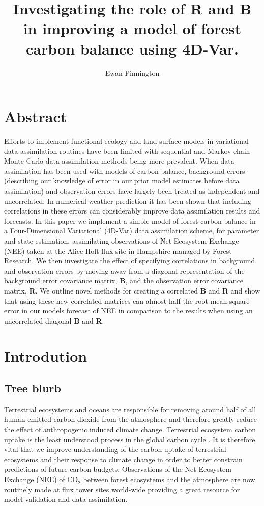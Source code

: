 \documentclass[11pt]{article}
\title{Investigating the role of \textbf{R} and \textbf{B} in improving a model of forest carbon balance using 4D-Var.}
\author{Ewan Pinnington}
\begin{document}
\maketitle

\section*{Abstract}

Efforts to implement functional ecology and land surface models in variational data assimilation routines have been limited with sequential and Markov chain Monte Carlo data assimilation methods being more prevalent. When data assimilation has been used with models of carbon balance, background errors (describing our knowledge of error in our prior model estimates before data assimilation) and observation errors have largely been treated as independent and uncorrelated. In numerical weather prediction it has been shown that including correlations in these errors can considerably improve data assimilation results and forecasts. In this paper we implement a simple model of forest carbon balance in a Four-Dimensional Variational (4D-Var) data assimilation scheme, for parameter and state estimation, assimilating observations of Net Ecosystem Exchange (NEE) taken at the Alice Holt flux site in Hampshire managed by Forest Research. We then investigate the effect of specifying correlations in background and observation errors by moving away from a diagonal representation of the background error covariance matrix, \textbf{B}, and the observation error covariance matrix, \textbf{R}. We outline novel methods for creating a correlated \textbf{B} and \textbf{R} and show that using these new correlated matrices can almost half the root mean square error in our models forecast of NEE in comparison to the results when using an uncorrelated diagonal \textbf{B} and \textbf{R}.      

\section{Introdution}

\subsection{Tree blurb}

Terrestrial ecosystems and oceans are responsible for removing around half of all human emitted carbon-dioxide from the atmosphere and therefore greatly reduce the effect of anthropogenic induced climate change. Terrestrial ecosystem carbon uptake is the least understood process in the global carbon cycle \citep{ciais2014carbon}. It is therefore vital that we improve understanding of the carbon uptake of terrestrial ecosystems and their response to climate change in order to better constrain predictions of future carbon budgets. Observations of the Net Ecosystem Exchange (NEE) of CO$_{2}$ between forest ecosystems and the atmosphere are now routinely made at flux tower sites world-wide \citep{baldocchi2008turner} providing a great resource for model validation and data assimilation.
\end{document}
